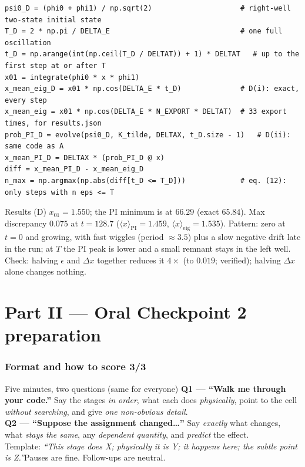 \documentclass[10pt]{article}
\begin{document}
\begin{lstlisting}
psi0_D = (phi0 + phi1) / np.sqrt(2)                     # right-well two-state initial state
T_D = 2 * np.pi / DELTA_E                               # one full oscillation
t_D = np.arange(int(np.ceil(T_D / DELTAT)) + 1) * DELTAT   # up to the first step at or after T
x01 = integrate(phi0 * x * phi1)
x_mean_eig_D = x01 * np.cos(DELTA_E * t_D)              # D(i): exact, every step
x_mean_eig = x01 * np.cos(DELTA_E * N_EXPORT * DELTAT)  # 33 export times, for results.json
prob_PI_D = evolve(psi0_D, K_tilde, DELTAX, t_D.size - 1)   # D(ii): same code as A
x_mean_PI_D = DELTAX * (prob_PI_D @ x)
diff = x_mean_PI_D - x_mean_eig_D
n_max = np.argmax(np.abs(diff[t_D <= T_D]))             # eq. (12): only steps with n eps <= T
\end{lstlisting}
\begin{resbox}{Results (D)}
$x_{01}=1.550$; the PI minimum is at $66.29$ (exact $65.84$). Max discrepancy $0.075$ at $t=128.7$ ($\langle x\rangle_\text{PI}=1.459$, $\langle x\rangle_\text{eig}=1.535$). Pattern: zero at $t=0$ and growing, with fast wiggles (period $\approx3.5$) plus a slow negative drift late in the run; at $T$ the PI peak is lower and a small remnant stays in the left well. Check: halving $\epsilon$ and $\Delta x$ together reduces it $4\times$ (to $0.019$; verified); halving $\Delta x$ alone changes nothing.
\end{resbox}

\part*{Part II --- Oral Checkpoint 2 preparation}

\section{Format and how to score 3/3}
\begin{keybox}{Five minutes, two questions (same for everyone)}
\textbf{Q1 --- ``Walk me through your code.''} Say the stages \emph{in order}, what each does \emph{physically}, point to the cell \emph{without searching}, and give \emph{one non-obvious detail}.\\
\textbf{Q2 --- ``Suppose the assignment changed\ldots''} Say \emph{exactly} what changes, what \emph{stays the same}, any \emph{dependent quantity}, and \emph{predict} the effect.\\[2pt]
Template: \emph{``This stage does X; physically it is Y; it happens here; the subtle point is Z.''}\quad Pauses are fine. Follow-ups are neutral.
\end{keybox}
\end{document}
